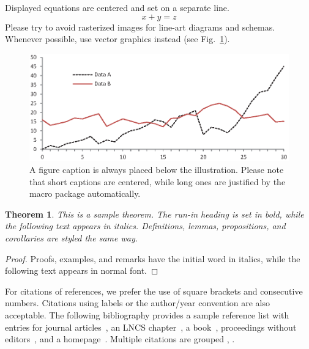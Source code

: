 \documentclass{tlp} %
\newtheorem{theorem}{Theorem}
\begin{document}
\noindent Displayed equations are centered and set on a separate
line.
\begin{equation}
x + y = z
\end{equation}
Please try to avoid rasterized images for line-art diagrams and
schemas. Whenever possible, use vector graphics instead (see
Fig.~\ref{fig1}).

\begin{figure}
\includegraphics[width=\textwidth]{fig1.eps}
\caption{A figure caption is always placed below the illustration.
Please note that short captions are centered, while long ones are
justified by the macro package automatically.} \label{fig1}
\end{figure}

\begin{theorem}
This is a sample theorem. The run-in heading is set in bold, while
the following text appears in italics. Definitions, lemmas,
propositions, and corollaries are styled the same way.
\end{theorem}
%
%
\begin{proof}
Proofs, examples, and remarks have the initial word in italics,
while the following text appears in normal font.
\end{proof}
For citations of references, we prefer the use of square brackets
and consecutive numbers. Citations using labels or the author/year
convention are also acceptable. The following bibliography provides
a sample reference list with entries for journal
articles~\cite{ref_article1}, an LNCS chapter~\cite{ref_lncs1}, a
book~\cite{ref_book1}, proceedings without editors~\cite{ref_proc1},
and a homepage~\cite{ref_url1}. Multiple citations are grouped
\cite{ref_article1,ref_lncs1,ref_book1},
\cite{ref_article1,ref_book1,ref_proc1,ref_url1}.
%
%
%
% 
% 
%

\end{document}
